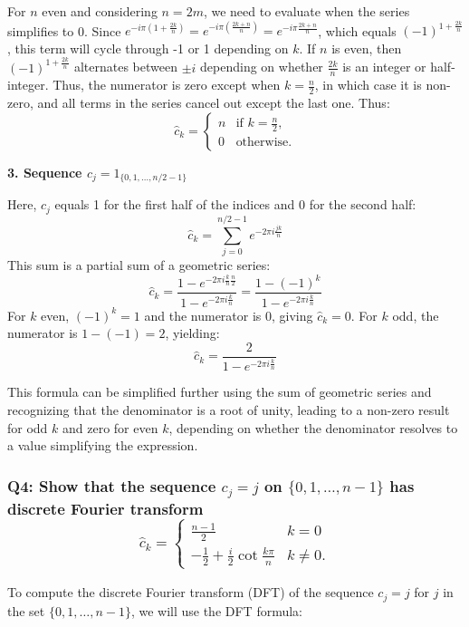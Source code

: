 \documentclass[8pt]{article}
\begin{document}
For \( n \) even and considering \( n = 2m \), we need to evaluate when the series simplifies to 0. Since \( e^{-i\pi (1 + \frac{2k}{n})} = e^{-i\pi (\frac{2k+n}{n})} = e^{-i\pi \frac{2k+n}{n}} \), which equals \( (-1)^{1+\frac{2k}{n}} \), this term will cycle through -1 or 1 depending on \( k \). If \( n \) is even, then \( (-1)^{1+\frac{2k}{n}} \) alternates between \( \pm i \) depending on whether \( \frac{2k}{n} \) is an integer or half-integer. Thus, the numerator is zero except when \( k = \frac{n}{2} \), in which case it is non-zero, and all terms in the series cancel out except the last one. Thus:
\[
\hat{c}_k = 
\begin{cases} 
n & \text{if } k = \frac{n}{2}, \\
0 & \text{otherwise}.
\end{cases}
\]

\textbf{3. Sequence \( c_j = 1_{\{0,1,\ldots,n/2-1\}} \)}

Here, \( c_j \) equals 1 for the first half of the indices and 0 for the second half:
\[
\hat{c}_k = \sum_{j=0}^{n/2-1} e^{-2\pi i \frac{jk}{n}}
\]
This sum is a partial sum of a geometric series:
\[
\hat{c}_k = \frac{1 - e^{-2\pi i \frac{k}{n} \frac{n}{2}}}{1 - e^{-2\pi i \frac{k}{n}}} = \frac{1 - (-1)^k}{1 - e^{-2\pi i \frac{k}{n}}}
\]
For \( k \) even, \( (-1)^k = 1 \) and the numerator is 0, giving \( \hat{c}_k = 0 \). For \( k \) odd, the numerator is \( 1 - (-1) = 2 \), yielding:
\[
\hat{c}_k = \frac{2}{1 - e^{-2\pi i \frac{k}{n}}}
\]

This formula can be simplified further using the sum of geometric series and recognizing that the denominator is a root of unity, leading to a non-zero result for odd \( k \) and zero for even \( k \), depending on whether the denominator resolves to a value simplifying the expression.

\subsubsection*{Q4:
Show that the sequence \( c_j = j \) on \(\{0, 1, \ldots, n-1\}\) has discrete Fourier transform
\[
   \hat{c}_k = \begin{cases} 
   \frac{n-1}{2} & k = 0 \\
   -\frac{1}{2} + \frac{i}{2} \cot \frac{k\pi}{n} & k \neq 0.
   \end{cases}
\]}

To compute the discrete Fourier transform (DFT) of the sequence \(c_j = j\) for \(j\) in the set \(\{0, 1, \ldots, n-1\}\), we will use the DFT formula:
\end{document}
